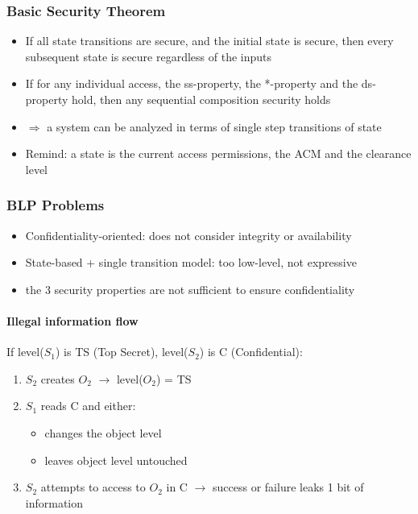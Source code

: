 \documentclass{article}
\newenvironment{myitemize}
{ \begin{itemize}
    \setlength{\itemsep}{005pt}
    \setlength{\parskip}{0pt}
    \setlength{\parsep}{0pt}     }
{ \end{itemize}                  }
\begin{document}
\begin{multicols}{2}
\subsubsection{Basic Security Theorem}

\begin{myitemize}
    \item If all state transitions are secure, and the initial state is secure, then every subsequent state is secure regardless of the inputs
    \item If for any individual access, the ss-property, the *-property and the ds-property hold, then any sequential composition security holds
    \item $\Rightarrow$ a system can be analyzed in terms of single step transitions of state
    \item Remind: a state is the current access permissions, the ACM and the clearance level
\end{myitemize}

\subsubsection{BLP Problems}

\begin{myitemize}
    \item Confidentiality-oriented: does not consider integrity or availability
    \item State-based + single transition model: too low-level, not expressive
    \item the 3 security properties are not sufficient to ensure confidentiality
\end{myitemize}


\paragraph{Illegal information flow}

If level($S_1$) is TS (Top Secret), level($S_2$) is C (Confidential):

\begin{enumerate}
    \item $S_2$ creates $O_2$ $\rightarrow$ level($O_2$) = TS
    \item $S_1$ reads C and either:
    \begin{myitemize}
        \item changes the object level
        \item leaves object level untouched 
    \end{myitemize}
    \item $S_2$ attempts to access to $O_2$ in C $\rightarrow$ success or failure leaks 1 bit of information
\end{enumerate}



\end{multicols}
\end{document}
